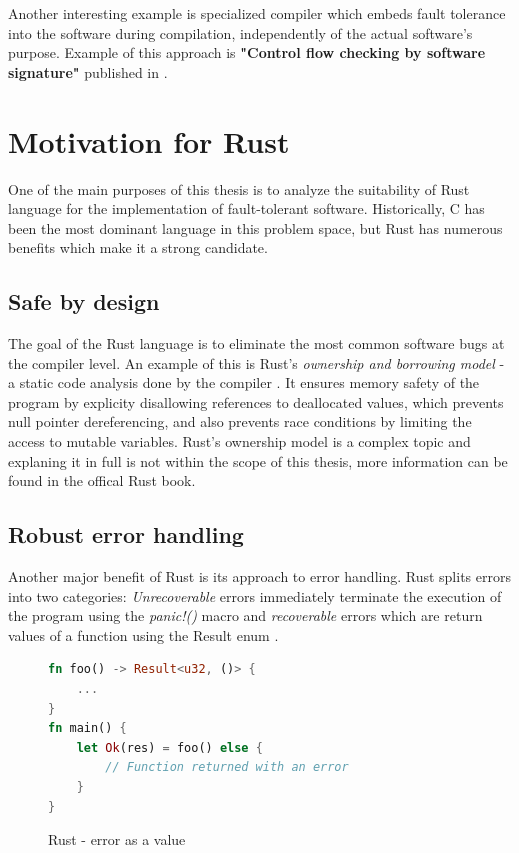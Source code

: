 \documentclass[12pt, letterpaper]{article}
\begin{document}
Another interesting example is specialized compiler which embeds fault tolerance into the software during compilation, independently of the actual software's purpose. Example of this approach is \textbf{"Control flow checking by software signature"} published in \cite{994926}.

\newpage

\section{Motivation for Rust}
One of the main purposes of this thesis is to analyze the suitability of Rust language for the implementation of fault-tolerant software. Historically, C has been the most dominant language in this problem space, but Rust has numerous benefits which make it a strong candidate.

\subsection{Safe by design}
The goal of the Rust language is to eliminate the most common software bugs at the compiler level. An example of this is Rust's \textit{ownership and borrowing model} - a static code analysis done by the compiler \cite{rust_book:ownership}. It ensures memory safety of the program by explicity disallowing references to deallocated values, which prevents null pointer dereferencing, and also prevents race conditions by limiting the access to mutable variables. Rust's ownership model is a complex topic and explaning it in full is not within the scope of this thesis, more information can be found in the offical Rust book.

\subsection{Robust error handling}
Another major benefit of Rust is its approach to error handling. Rust splits errors into two categories: \textit{Unrecoverable} errors immediately terminate the execution of the program using the \textit{panic!()} macro and \textit{recoverable} errors which are return values of a function using the Result enum \cite{rust_book:error_handling}.

\begin{figure}[!h]
\begin{lstlisting}[language=Rust]
fn foo() -> Result<u32, ()> {
    ...
}
fn main() {
    let Ok(res) = foo() else {
        // Function returned with an error
    }
}
\end{lstlisting}
\caption{Rust - error as a value}
\label{fig:rust_error}
\end{figure}
\end{document}

